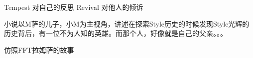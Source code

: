 Tempest 对自己的反思
Revival 对他人的倾诉
    
小说以M萨的儿子，小M为主视角，讲述在探索Style历史的时候发现Style光辉的历史背后，有一位不为人知的英雄。而那个人，好像就是自己的父亲。。。

仿照FFT拉姆萨的故事